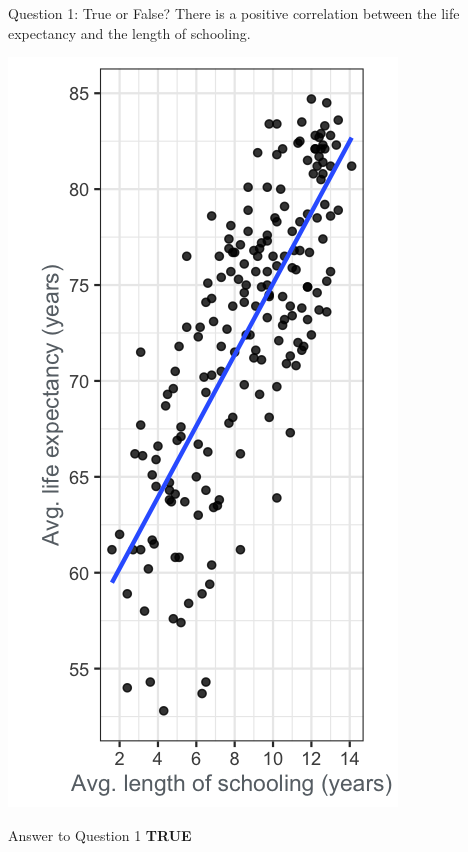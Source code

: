 \documentclass[
  ignorenonframetext,
]{beamer}
\begin{document}
\begin{frame}{Question 1: True or False?}
\label{question-1-true-or-false}
There is a positive correlation between the life expectancy and the
length of schooling.

\includegraphics{../images/im40.png}
\end{frame}

\begin{frame}{Answer to Question 1}
\label{answer-to-question-1}
\textbf{TRUE}
\end{frame}
\end{document}
